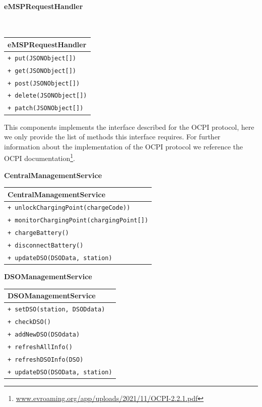 \paragraph{eMSPRequestHandler}\mbox{}\\
\begin{table}[H]
    \centering
    \begin{tabular}{|l|}
        \hline
        \textbf{eMSPRequestHandler} \\
        \hline
        \verb|+ put(JSONObject[])|\\
        \verb|+ get(JSONObject[])|\\
        \verb|+ post(JSONObject[])|\\
        \verb|+ delete(JSONObject[])|\\
        \verb|+ patch(JSONObject[])|\\
        \hline
    \end{tabular}
\end{table}
This components implements the interface described for the OCPI protocol, here we only provide the list of methods this interface requires. For further information about the implementation of the OCPI protocol we reference the OCPI documentation\footnote{\url{www.evroaming.org/app/uploads/2021/11/OCPI-2.2.1.pdf}}.

\textbf{CentralManagementService}\\
\begin{table}[H]
    \centering
    \begin{tabular}{|l|}
        \hline
        \textbf{CentralManagementService} \\
        \hline
        \verb|+ unlockChargingPoint(chargeCode))|\\
        \verb|+ monitorChargingPoint(chargingPoint[])|\\
        \verb|+ chargeBattery()|\\
        \verb|+ disconnectBattery()|\\
        \verb|+ updateDSO(DSOData, station)|\\
        \hline
    \end{tabular}
\end{table}
\pagebreak
\textbf{DSOManagementService}\\
\begin{table}[H]
    \centering
    \begin{tabular}{|l|}
        \hline
        \textbf{DSOManagementService} \\
        \hline
        \verb|+ setDSO(station, DSODdata)|\\
        \verb|+ checkDSO()|\\
        \verb|+ addNewDSO(DSOdata)|\\
        \verb|+ refreshAllInfo()|\\
        \verb|+ refreshDSOInfo(DSO)|\\
        \verb|+ updateDSO(DSOData, station)|\\
        \hline
    \end{tabular}
\end{table}

